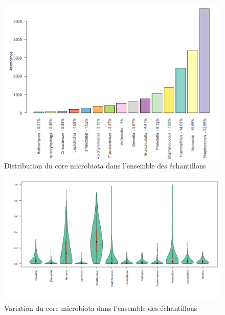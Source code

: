 \documentclass[12pt,a4paper]{article}
\begin{document}
\begin{figure}[t]
\begin{center}
\includegraphics[scale=0.5]{img/core.png}\hfill
\end{center}
\caption{Distribution du core microbiota dans l'ensemble des échantillons}
\label{core}
\end{figure}



\begin{figure}[t]
\begin{center}
\includegraphics[scale=0.5]{img/variability.png}\hfill
\end{center}
\caption{Variation du core microbiota dans l'ensemble des échantillons}
\label{violon}
\end{figure}
\end{document}
